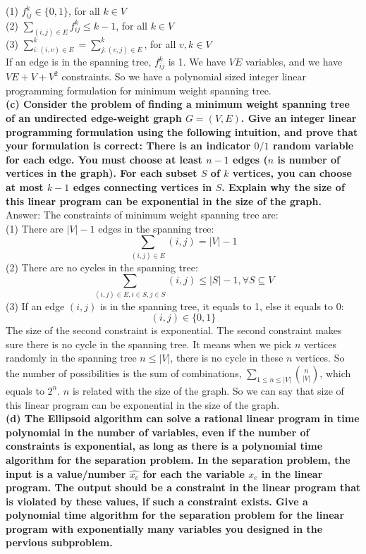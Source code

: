 \documentclass{article}
\begin{document}
(1) $f_{ij}^{k}\in \{{0, 1}\}$, for all $k\in V$\\ \newline
(2) $\sum_{(i,j)\in E}f_{ij}^{k} \leq k - 1$, for all $k\in V$\\ \newline
(3) $\sum_{i: (i,v)\in E}^{k} = \sum_{j:(v, j)\in E}^{k}$, for all $v, k\in V$ \\ \newline
If an edge is in the spanning tree, $f_{ij}^{k}$ is 1. We have $VE$ variables, and we have $VE + V + V^2$ constraints. So we have a polynomial sized integer linear programming formulation for minimum weight spanning tree.\\ \newline
\textbf{(c) Consider the problem of finding a minimum weight spanning tree of an undirected edge-weight graph $G = (V, E)$. Give an integer linear programming formulation using the following intuition, and prove that your formulation is correct: There is an indicator $0/1$ random variable for each edge. You must choose at least $n - 1$ edges ($n$ is number of vertices in the graph). For each subset $S$ of $k$ vertices, you can choose at most $k - 1$ edges connecting vertices in $S$. Explain why the size of this linear program can be exponential in the size of the graph.} \\\newline
Answer: The constraints of minimum weight spanning tree are: \\
(1) There are $|V| - 1$ edges in the spanning tree: $$\sum_{(i,j)\in E} (i,j) = |V| - 1$$
(2) There are no cycles in the spanning tree: $$\sum_{(i,j)\in E, i\in S, j\in S}(i, j) \leq |S| - 1, \forall S\subseteq{V}$$ 
(3) If an edge $(i,j)$ is in the spanning tree, it equals to 1, else it equals to 0: $$(i,j)\in \{0,1\}$$
The size of the second constraint is exponential. The second constraint makes sure there is no cycle in the spanning tree. It means when we pick $n$ vertices randomly in the spanning tree $n\leq |V|$, there is no cycle in these $n$ vertices. So the number of possibilities is the sum of combinations, $\sum_{1\leq n \leq |V|}\binom{n}{|V|}$, which equals to $2^n$. $n$ is related with the size of the graph. So we can say that size of this linear program can be exponential in the size of the graph. \\ \newline
\textbf{(d) The Ellipsoid algorithm can solve a rational linear program in time polynomial in the number of variables, even if the number of constraints is exponential, as long as there is a polynomial time algorithm for the separation problem. In the separation problem, the input is a value/number $\hat{x_e}$ for each the variable $x_e$ in the linear program. The output should be a constraint in the linear program that is violated by these values, if such a constraint exists. Give a polynomial time algorithm for the separation problem for the linear program with exponentially many variables you designed in the pervious subproblem.}
\end{document}
